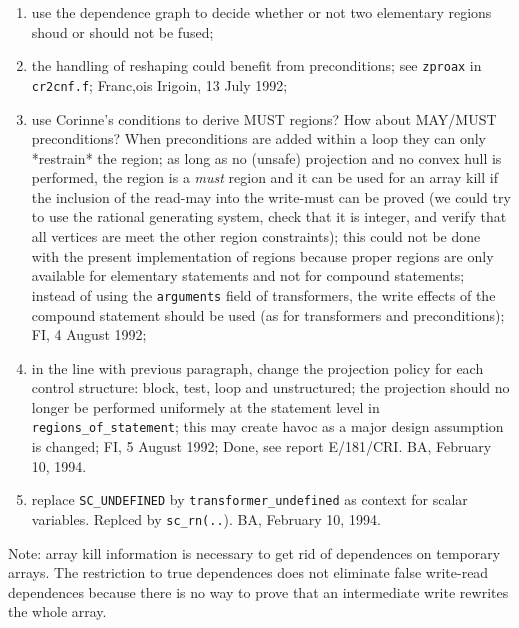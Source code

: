 \begin{enumerate}

  \item use the dependence graph to decide whether or not two elementary
        regions shoud or should not be fused;

  \item the handling of reshaping could benefit from preconditions;
        see \verb+zproax+ in \verb+cr2cnf.f+; Franc,ois Irigoin,
        13 July 1992;

  \item use {Corinne}'s conditions to derive MUST regions? How about MAY/MUST
        preconditions? When preconditions are added within a loop they
        can only *restrain* the region; as long as no (unsafe) projection
        and no convex hull is performed, the region is a {\em must} region
        and it can be used for an array kill if the inclusion of the
        read-may into the write-must can be proved (we could try to use
        the rational generating system, check that it is integer, and
        verify that all vertices are meet the other region constraints);
        this could not be done with the present implementation of regions
        because proper regions are only available for elementary statements
        and not for compound statements; instead of using the \verb+arguments+
        field of transformers, the write effects of the compound statement
        should be used (as for transformers and preconditions);
        FI, 4 August 1992;

  \item in the line with previous paragraph, change the projection
        policy for each control structure: block, test, loop and
        unstructured; the projection should no longer be performed
        uniformely at the statement level in \verb+regions_of_statement+;
        this may create havoc as a major design assumption is changed;
        FI, 5 August 1992; Done, see report E/181/CRI. BA, February 10, 1994.

      \item replace \verb+SC_UNDEFINED+ by \verb+transformer_undefined+ as
        context for scalar variables. Replced by {\tt sc\_rn(..}). BA,
        February 10, 1994.

\end{enumerate}

Note: array kill information is necessary to get rid of dependences on
temporary arrays. The restriction to true dependences does not eliminate
false write-read dependences because there is no way to prove that an
intermediate write rewrites the whole array.

